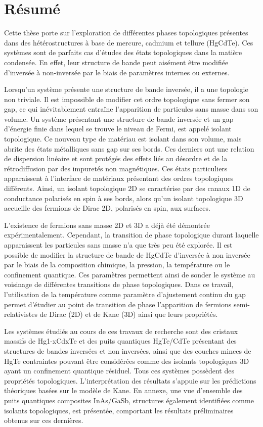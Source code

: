 \documentclass[titlepage,a4paper]{book}
\newcommand{\wciecie}{\quad\phantom{v}}
\begin{document}
\chapter*{Résumé}
\wciecie
Cette thèse porte sur l'exploration de différentes phases topologiques présentes dans des hétérostructures à base de mercure, cadmium et tellure (HgCdTe). Ces systèmes sont de parfaits cas d'études des états topologiques dans la matière condensée. En effet, leur structure de bande peut aisément être modifiée d'inversée à non-inversée par le biais de paramètres internes ou externes.

Lorsqu'un système présente une structure de bande inversée, il a une topologie non triviale. Il est impossible de modifier cet ordre topologique sans fermer son gap, ce qui inévitablement entraîne l'apparition de particules sans masse dans son volume. Un système présentant une structure de bande inversée et un gap d'énergie finie dans lequel se trouve le niveau de Fermi, est appelé isolant topologique. Ce nouveau type de matériau est isolant dans son volume, mais abrite des états métalliques sans gap sur ses bords. Ces derniers ont une relation de dispersion linéaire et sont protégés des effets liés au désordre et de la rétrodiffusion par des impuretés non magnétiques. Ces états particuliers apparaissent à l'interface de matériaux présentant des ordres topologiques différents. Ainsi, un isolant topologique 2D se caractérise par des canaux 1D de conductance polarisés en spin à ses bords, alors qu'un isolant topologique 3D accueille des fermions de Dirac 2D, polarisés en spin, aux surfaces.

L'existence de fermions sans masse 2D et 3D a déjà été démontrée expérimentalement. Cependant, la transition de phase topologique durant laquelle apparaissent les particules sans masse n'a que très peu été explorée. Il est possible de modifier la structure de bande de HgCdTe d'inversée à non inversée par le biais de la composition chimique, la pression, la température ou le confinement quantique. Ces paramètres permettent ainsi de sonder le système au voisinage de différentes transitions de phase topologiques. Dans ce travail, l'utilisation de la température comme paramètre d'ajustement continu du gap permet d'étudier au point de transition de phase l'apparition de fermions semi-relativistes de Dirac (2D) et de Kane (3D) ainsi que leurs propriétés.

Les systèmes étudiés au cours de ces travaux de recherche sont des cristaux massifs de Hg1-xCdxTe et des puits quantiques HgTe/CdTe présentant des structures de bandes inversées et non inversées, ainsi que des couches minces de HgTe contraintes pouvant être considérées comme des isolants topologiques 3D ayant un confinement quantique résiduel. Tous ces systèmes possèdent des propriétés topologiques. L'interprétation des résultats s'appuie sur les prédictions théoriques basées sur le modèle de Kane. En annexe, une vue d'ensemble des puits quantiques composites InAs/GaSb, structures également identifiées comme isolants topologiques, est présentée, comportant les résultats préliminaires obtenus sur ces dernières.
\end{document}
